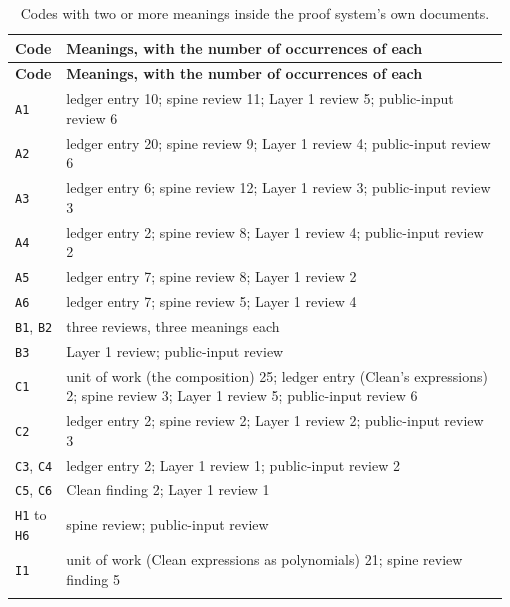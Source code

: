 {\footnotesize\setlength{\tabcolsep}{3pt}
\begin{longtable}{@{}>{\raggedright\arraybackslash}p{0.098\linewidth}>{\raggedright\arraybackslash}p{0.885\linewidth}@{}}
\caption{Codes with two or more meanings inside the proof system's own documents.}\label{tab:docs-code-collisions}\\
\toprule
\textbf{Code} & \textbf{Meanings, with the number of occurrences of each} \\
\midrule
\endfirsthead
\toprule
\textbf{Code} & \textbf{Meanings, with the number of occurrences of each} \\
\midrule
\endhead
\bottomrule
\endfoot
\texttt{A1} & ledger entry 10; spine review 11; Layer 1 review 5; public-input review 6 \\\addlinespace[2pt]
\texttt{A2} & ledger entry 20; spine review 9; Layer 1 review 4; public-input review 6 \\\addlinespace[2pt]
\texttt{A3} & ledger entry 6; spine review 12; Layer 1 review 3; public-input review 3 \\\addlinespace[2pt]
\texttt{A4} & ledger entry 2; spine review 8; Layer 1 review 4; public-input review 2 \\\addlinespace[2pt]
\texttt{A5} & ledger entry 7; spine review 8; Layer 1 review 2 \\\addlinespace[2pt]
\texttt{A6} & ledger entry 7; spine review 5; Layer 1 review 4 \\\addlinespace[2pt]
\texttt{B1}, \texttt{B2} & three reviews, three meanings each \\\addlinespace[2pt]
\texttt{B3} & Layer 1 review; public-input review \\\addlinespace[2pt]
\texttt{C1} & unit of work (the composition) 25; ledger entry (Clean's expressions) 2; spine review 3; Layer 1 review 5; public-input review 6 \\\addlinespace[2pt]
\texttt{C2} & ledger entry 2; spine review 2; Layer 1 review 2; public-input review 3 \\\addlinespace[2pt]
\texttt{C3}, \texttt{C4} & ledger entry 2; Layer 1 review 1; public-input review 2 \\\addlinespace[2pt]
\texttt{C5}, \texttt{C6} & Clean finding 2; Layer 1 review 1 \\\addlinespace[2pt]
\texttt{H1} to \texttt{H6} & spine review; public-input review \\\addlinespace[2pt]
\texttt{I1} & unit of work (Clean expressions as polynomials) 21; spine review finding 5 \\\addlinespace[2pt]

\end{longtable}}
